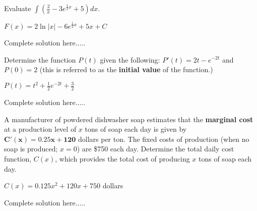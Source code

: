 \begin{example}
Evaluate $\displaystyle\int \left(\frac{2}{x}-3e^{\frac{1}{2}x}+5\right) dx$. 
    \begin{sol}
     $F(x)=2\ln|x|-6e^{\frac{1}{2}x}+5x+C$ 
    \end{sol}
    \begin{solL}
    Complete solution here.....
    
    \end{solL}
    
\end{example}
\begin{example}
Determine the function $P(t)$ given the following: $P'(t)=2t-e^{-2t}$ and $P(0)=2$ (this is referred to as the \textbf{initial value} of the function.)
    \begin{sol}
     $P(t)=t^2+\displaystyle\frac{1}{2}e^{-2t}+\displaystyle\frac{3}{2}$ 
    \end{sol}
    \begin{solL}
    Complete solution here.....
    
    \end{solL}
    
\end{example}
\newpage
\begin{example}
A manufacturer of powdered dishwasher soap estimates that the \textbf{marginal cost} at a production level of $x$ tons of soap each day is given by $\bm{C' (x)=0.25x+120}$ dollars per ton.  The fixed costs of production (when no soap is produced; $x=0$) are \$750 each day.  Determine the total daily cost function, $C(x)$, which provides the total cost of producing $x$ tons of soap each day.
    \begin{sol}
     $C(x)=0.125x^2+120x+750$ dollars
    \end{sol}
    \begin{solL}
    Complete solution here.....
    
    \end{solL}
    
\end{example}

